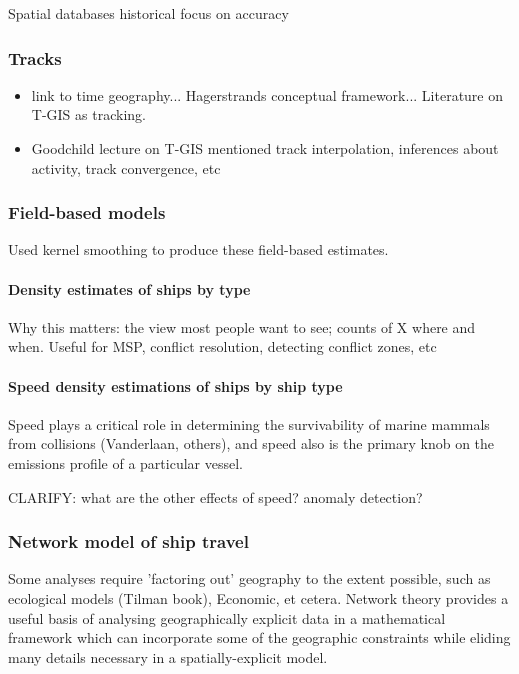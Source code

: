 Spatial databases historical focus on accuracy \citep{goodchild1989accuracy}

\subsubsection{Tracks}
 \begin{itemize}
   \item link to time geography... Hagerstrands conceptual framework... Literature on T-GIS as tracking.
   \item Goodchild lecture on T-GIS mentioned track interpolation, inferences about activity, track convergence, etc

 \end{itemize}

\subsubsection{Field-based models}

Used kernel smoothing to produce these field-based estimates.

\paragraph{Density estimates of ships by type}

Why this matters: the view most people want to see; counts of X where and when. Useful for MSP, conflict resolution, detecting conflict zones, etc

\paragraph{Speed density estimations of ships by ship type}

Speed plays a critical role in determining the survivability of marine mammals from collisions (Vanderlaan, others), and speed also is the primary knob on the emissions profile of a particular vessel.

CLARIFY: what are the other effects of speed? anomaly detection?

\subsubsection{Network model of ship travel}

Some analyses require 'factoring out' geography to the extent possible, such as ecological models (Tilman book), Economic, et cetera. Network theory provides a useful basis of analysing geographically explicit data in a mathematical framework which can incorporate some of the geographic constraints while eliding many details necessary in a spatially-explicit model.

